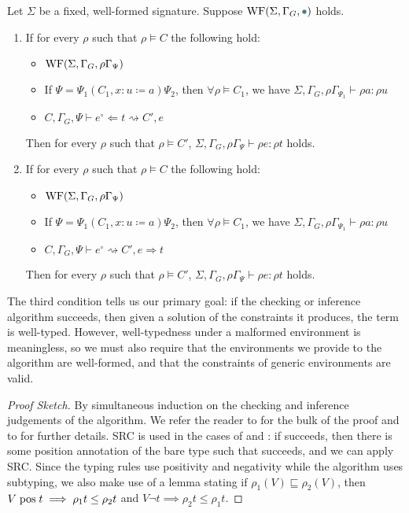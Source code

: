 \begin{theorem}
  Let $\Sigma$ be a fixed, well-formed signature.
  Suppose $\WF{\Sigma, \Gamma_G, \mt}$ holds.
  \begin{enumerate}
    \item If for every $\rho$ such that $\rho \vDash C$ the following hold:
      \begin{itemize}
        \item $\textrm{WF}(\Sigma, \Gamma_G, \rho\Gamma_\Psi)$
        \item If $\Psi = \Psi_1 (C_1, x : u \coloneqq a) \Psi_2$, then $\forall \rho \vDash C_1$, we have $\Sigma, \Gamma_G, \rho \Gamma_{\Psi_1} \vdash \rho a : \rho u$
        \item $C, \Gamma_G, \Psi \vdash e^\circ \Leftarrow t \rightsquigarrow C', e$
      \end{itemize}
      Then for every $\rho$ such that $\rho \vDash C'$, $\Sigma, \Gamma_G, \rho\Gamma_\Psi \vdash \rho e : \rho t$ holds.
    \item If for every $\rho$ such that $\rho \vDash C$ the following hold:
      \begin{itemize}
        \item $\textrm{WF}(\Sigma, \Gamma_G, \rho\Gamma_\Psi)$
        \item If $\Psi = \Psi_1 (C_1, x : u \coloneqq a) \Psi_2$, then $\forall \rho \vDash C_1$, we have $\Sigma, \Gamma_G, \rho \Gamma_{\Psi_1} \vdash \rho a : \rho u$
        \item $C, \Gamma_G, \Psi \vdash e^\circ \rightsquigarrow C', e \Rightarrow t$
      \end{itemize}
      Then for every $\rho$ such that $\rho \vDash C'$, $\Sigma, \Gamma_G, \rho\Gamma_\Psi \vdash \rho e : \rho t$ holds.
  \end{enumerate}
\end{theorem}

The third condition tells us our primary goal: if the checking or inference algorithm succeeds, then given a solution of the constraints it produces, the term is well-typed.
However, well-typedness under a malformed environment is meaningless, so we must also require that the environments we provide to the algorithm are well-formed, and that the constraints of generic environments are valid.

\begin{proof}[Proof Sketch]
  By simultaneous induction on the checking and inference judgements of the algorithm.
  We refer the reader to \anotherpdf for the bulk of the proof and to \citet{f-hat, cc-hat-omega} for further details.
  SRC is used in the cases of  and : if \RecCheckLoop succeeds, then there is some position annotation of the bare \cofixpoint type such that \RecCheck succeeds, and we can apply SRC.
  Since the typing rules use positivity and negativity while the algorithm uses subtyping, we also make use of a lemma stating if $\rho_1(V) \sqsubseteq \rho_2(V)$, then $V \mathrel{\text{pos}} t \implies \rho_1 t \leq \rho_2 t$ and $V \neg t \implies \rho_2 t \leq \rho_1 t$.
\end{proof}

